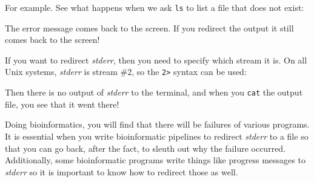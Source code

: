 \documentclass[]{krantz}
\makeatletter
\newenvironment{Shaded}{\begin{snugshade}}{\end{snugshade}}
\newcommand{\ExtensionTok}[1]{#1}
\newcommand{\NormalTok}[1]{#1}
\newcommand{\OperatorTok}[1]{\textcolor[rgb]{0.43,0.43,0.43}{\textbf{#1}}}
\newenvironment{kframe}{%
\medskip{}
\setlength{\fboxsep}{.8em}
 \def\at@end@of@kframe{}%
 \ifinner\ifhmode%
  \def\at@end@of@kframe{\end{minipage}}%
  \begin{minipage}{\columnwidth}%
 \fi\fi%
 \def\FrameCommand##1{\hskip\@totalleftmargin \hskip-\fboxsep
 \colorbox{shadecolor}{##1}\hskip-\fboxsep
     \hskip-\linewidth \hskip-\@totalleftmargin \hskip\columnwidth}%
 \MakeFramed {\advance\hsize-\width
   \@totalleftmargin\z@ \linewidth\hsize
   \@setminipage}}%
 {\par\unskip\endMakeFramed%
 \at@end@of@kframe}
\renewenvironment{Shaded}{\begin{kframe}}{\end{kframe}}
\makeatother
\begin{document}
For example. See what happens when we ask \texttt{ls} to list a file that does not exist:

\begin{Shaded}
\end{Shaded}

The error message comes back to the screen. If you redirect the output
it still comes back to the screen!

\begin{Shaded}
\end{Shaded}

If you want to redirect \emph{stderr}, then you need to specify which stream
it is. On all Unix systems, \emph{stderr} is stream \#2, so the \texttt{2\textgreater{}} syntax can be
used:

\begin{Shaded}
\begin{Highlighting}[]
\NormalTok{[}\ExtensionTok{~}\NormalTok{]}\ExtensionTok{--%
\end{Highlighting}
\end{Shaded}

Then there is no output of \emph{stderr} to the terminal, and when you \texttt{cat} the output
file, you see that it went there!

\begin{Shaded}
\end{Shaded}

Doing bioinformatics, you will find that there will be failures of various programs.
It is essential when you write bioinformatic pipelines to redirect \emph{stderr} to a
file so that you can go back, after the fact, to sleuth out why the failure occurred.
Additionally, some bioinformatic programs write things like progress messages to
\emph{stderr} so it is important to know how to redirect those as well.
\end{document}

